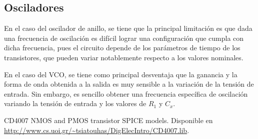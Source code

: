 \documentclass[twocolumn]{IEEEtran}
\begin{document}
\subsection{Osciladores}
En el caso del oscilador de anillo, se tiene que la principal limitación es que dada una frecuencia de oscilación es difícil lograr una configuración que cumpla con dicha frecuencia, pues el circuito depende de los parámetros de tiempo de los transistores, que pueden variar notablemente respecto a los valores nominales. 

En el caso del VCO, se tiene como principal desventaja que la ganancia y la forma de onda obtenida a la salida es muy sensible a la variación de la tensión de entrada. Sin embargo, es sencillo obtener una frecuencia específica de oscilación variando la tensión de entrada y los valores de $R_1$ y $C_x$.




\begin{thebibliography}{99}


   CD4007 NMOS and PMOS transistor SPICE models. Disponible en \url{http://www.cs.uoi.gr/~tsiatouhas/DigElecIntro/CD4007.lib}.

\end{thebibliography}
\end{document}
